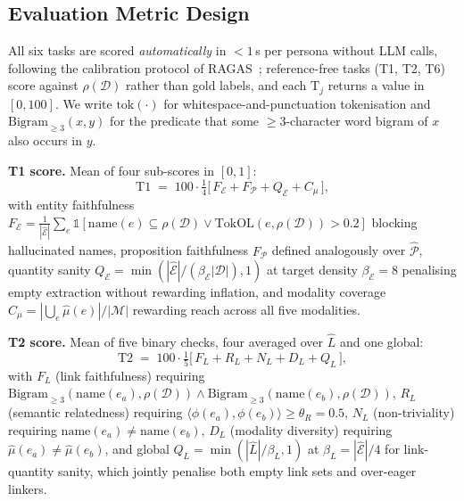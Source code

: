 \documentclass{article}
\begin{document}
\subsection{Evaluation Metric Design}\label{app:bench-metric}

All six tasks are scored \emph{automatically} in $<\!1$\,s per persona without LLM calls, following the calibration protocol of RAGAS~\citep{RAGAS}; reference-free tasks (T1, T2, T6) score against $\rho(\mathcal{D})$ rather than gold labels, and each $\mathrm{T}_j$ returns a value in $[0,100]$. We write $\mathrm{tok}(\cdot)$ for whitespace-and-punctuation tokenisation and $\mathrm{Bigram}_{\geq3}(x,y)$ for the predicate that some $\geq\!3$-character word bigram of $x$ also occurs in $y$.

\noindent\textbf{T1 score.} Mean of four sub-scores in $[0,1]$:
\begin{equation}
\mathrm{T1} \;=\; 100\cdot\tfrac{1}{4}\bigl[\,F_{\mathcal{E}}\!+\!F_{\mathcal{P}}\!+\!Q_{\mathcal{E}}\!+\!C_{\mu}\,\bigr],
\label{eq:m-t1}
\end{equation}
with entity faithfulness $F_{\mathcal{E}}\!=\!\frac{1}{|\hat{\mathcal{E}}|}\!\sum_{e}\!\mathbb{1}[\mathrm{name}(e)\!\subseteq\!\rho(\mathcal{D})\!\vee\!\mathrm{TokOL}(e,\rho(\mathcal{D}))\!>\!0.2]$ blocking hallucinated names, proposition faithfulness $F_{\mathcal{P}}$ defined analogously over $\hat{\mathcal{P}}$, quantity sanity $Q_{\mathcal{E}}\!=\!\min(|\hat{\mathcal{E}}|/(\beta_{\mathcal{E}}|\mathcal{D}|),1)$ at target density $\beta_{\mathcal{E}}\!=\!8$ penalising empty extraction without rewarding inflation, and modality coverage $C_{\mu}\!=\!|\!\bigcup_e\!\hat{\mu}(e)|/|\mathcal{M}|$ rewarding reach across all five modalities.

\noindent\textbf{T2 score.} Mean of five binary checks, four averaged over $\hat{L}$ and one global:
\begin{equation}
\mathrm{T2} \;=\; 100\cdot\tfrac{1}{5}\bigl[\,F_L\!+\!R_L\!+\!N_L\!+\!D_L\!+\!Q_L\,\bigr],
\label{eq:m-t2}
\end{equation}
with $F_L$ (link faithfulness) requiring $\mathrm{Bigram}_{\geq3}(\mathrm{name}(e_a),\rho(\mathcal{D}))\!\wedge\!\mathrm{Bigram}_{\geq3}(\mathrm{name}(e_b),\rho(\mathcal{D}))$, $R_L$ (semantic relatedness) requiring $\langle\phi(e_a),\phi(e_b)\rangle\!\geq\!\theta_R\!=\!0.5$, $N_L$ (non-triviality) requiring $\mathrm{name}(e_a)\!\neq\!\mathrm{name}(e_b)$, $D_L$ (modality diversity) requiring $\hat{\mu}(e_a)\!\neq\!\hat{\mu}(e_b)$, and global $Q_L\!=\!\min(|\hat{L}|/\beta_L,1)$ at $\beta_L\!=\!|\hat{\mathcal{E}}|/4$ for link-quantity sanity, which jointly penalise both empty link sets and over-eager linkers.
\end{document}

